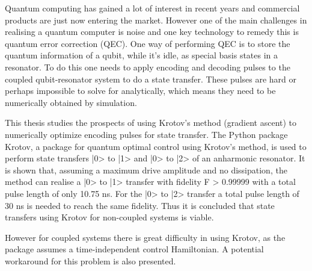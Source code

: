 \documentclass[main.tex]{subfiles}
\begin{document}
Quantum computing has gained a lot of interest in recent years and commercial products are just now entering the market.
However one of the main challenges in realising a quantum computer is noise and one key technology to remedy this is quantum error correction (QEC).
One way of performing QEC is to store the quantum information of a qubit, while it's idle, as special basis states in a resonator.
To do this one needs to apply encoding and decoding pulses to the coupled qubit-resonator system to do a state transfer.
These pulses are hard or perhaps impossible to solve for analytically, which means they need to be numerically obtained by simulation.

This thesis studies the prospects of using Krotov's method (gradient ascent) to numerically optimize encoding pulses for state transfer.
The Python package Krotov, a package for quantum optimal control using Krotov's method, is used to perform state transfers |0> to |1> and |0> to |2> of an anharmonic resonator.
It is shown that, assuming a maximum drive amplitude and no dissipation, the method can realise a |0> to |1> transfer with fidelity F > 0.99999 with a total pulse length of only 10.75 ns.
For the |0> to |2> transfer a total pulse length of 30 ns is needed to reach the same fidelity.
Thus it is concluded that state transfers using Krotov for non-coupled systems is viable.

However for coupled systems there is great difficulty in using Krotov, as the package assumes a time-independent control Hamiltonian.
A potential workaround for this problem is also presented.
\end{document}
